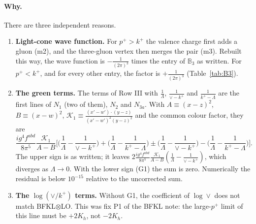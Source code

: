 \documentclass[10pt]{article}
\numberwithin{equation}{section}
\def\mf#1{\mathbb{#1}}
\newcommand{\KK}{\mathcal K}
\begin{document}
\paragraph{Why.} There are three independent reasons.
\begin{enumerate}
\item \textbf{Light-cone wave function.} For $p^+>k^+$ the valence charge first adds a gluon (m2), and the three-gluon vertex then merges the pair (m3). Rebuilt this way, the wave function is $-\frac{1}{(2\pi)^3}$ times the entry of $\mf B_3$ as written. For $p^+<k^+$, and for every other entry, the factor is $+\frac{1}{(2\pi)^3}$ (Table~\ref{tab:B3}).
\item \textbf{The green terms.} The terms of Row III with $\frac1\Lambda$, $\frac1{\vee-k^+}$ and $\frac1{k^+-\Lambda}$ are the first lines of $N_1$ (two of them), $N_2$ and $N_{3a}$. With $A\equiv(x-z)^2$, $B\equiv(x-w)^2$, $\KK_1\equiv\frac{(x'-w')\cdot(y-z)}{(x'-w')^2(y-z)^2}$ and the common colour factor, they are
\begin{equation}
\frac{ig^4f^{abd}}{8\pi^5}\frac{\KK_1}{A-B}\Big[\Big(\frac1\Lambda-\frac{1}{\vee-k^+}\Big)+\Big(\frac1\Lambda-\frac{1}{k^+-\Lambda}\Big)\pm\Big(\frac1\Lambda-\frac{1}{\vee-k^+}\Big)-\Big(\frac1\Lambda-\frac{1}{k^+-\Lambda}\Big)\Big].
\end{equation}
The upper sign is as written; it leaves $2\frac{ig^4f^{abd}}{8\pi^5}\frac{\KK_1}{A-B}(\frac1\Lambda-\frac{1}{\vee-k^+})$, which diverges as $\Lambda\to0$. With the lower sign (G1) the sum is zero. Numerically the residual is below $10^{-15}$ relative to the uncorrected sum.
\item \textbf{The $\log(\vee/k^+)$ terms.} Without G1, the coefficient of $\log\vee$ does not match BFKL$\otimes$LO. This was fix P1 of the BFKL note: the large-$p^+$ limit of this line must be $+2K_h$, not $-2K_h$.
\end{enumerate}

\end{document}
